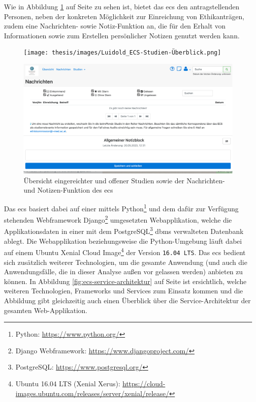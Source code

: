 \documentclass[a4paper,12pt,twoside]{scrreprt}
\begin{document}
Wie in Abbildung \ref{fig:ecs-studien-nachrichten-notizen} auf Seite \pageref{fig:ecs-studien-nachrichten-notizen} zu sehen ist, bietet das \ac{ecs} den antragstellenden Personen, neben der konkreten Möglichkeit zur Einreichung von Ethikanträgen, zudem eine Nachrichten- sowie Notiz-Funktion an, die für den Erhalt von Informationen sowie zum Erstellen persönlicher Notizen genutzt werden kann.

\begin{figure}[ht!]
    \centering
    \begin{minipage}[t]{.85\linewidth}
        \texttt{[image: thesis/images/Luidold\_ECS-Studien-Überblick.png]}
    \end{minipage}
    \begin{minipage}[b]{.85\linewidth}
        \includegraphics[width=\linewidth]{thesis/images/Luidold_ECS-Nachrichten-Notizen.png}
    \end{minipage}
    \caption[Übersicht eingereichter und offener Studien (oben) sowie der Nachrichten- und Notizen-Funktion (unten) des \acl{ecs}]{Übersicht eingereichter und offener Studien sowie der Nachrichten- und Notizen-Funktion des \acl{ecs} \cite{ethikkommission_der_medizinischen_universitat_innsbruck_ethikkommission_2023}}
    \label{fig:ecs-studien-nachrichten-notizen}
\end{figure}

Das \acl{ecs} basiert dabei auf einer mittels Python\footnote{Python: \url{https://www.python.org/}} und dem dafür zur Verfügung stehenden Webframework Django\footnote{Django Webframework: \url{https://www.djangoproject.com/}} umgesetzten Webapplikation, welche die Applikationsdaten in einer mit dem PostgreSQL\footnote{PostgreSQL: \url{https://www.postgresql.org/}} \ac{dbms} verwalteten Datenbank ablegt. Die Webapplikation beziehungsweise die Python-Umgebung läuft dabei auf einem Ubuntu Xenial Cloud Image\footnote{Ubuntu 16.04 LTS (Xenial Xerus): \url{https://cloud-images.ubuntu.com/releases/server/xenial/release/}} der Version \texttt{16.04 LTS}. Das \ac{ecs} bedient sich zusätzlich weiterer Technologien, um die gesamte Anwendung (und auch die Anwendungsfälle, die in dieser Analyse außen vor gelassen werden) anbieten zu können. In Abbildung \ref{fig:ecs-service-architektur} auf Seite \pageref{fig:ecs-service-architektur} ist ersichtlich, welche weiteren Technologien, Frameworks und Services zum Einsatz kommen und die Abbildung gibt gleichzeitig auch einen Überblick über die Service-Architektur der gesamten Web-Applikation. \cite{medizinische_universitat_wien_ecs-docs_about-2021, medizinische_universitat_wien_ecs-handbook_development-2021}
\end{document}
